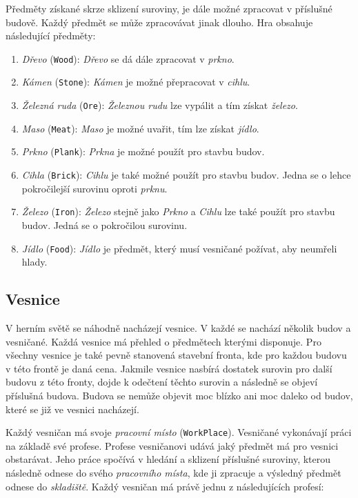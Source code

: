Předměty získané skrze sklizení suroviny, je dále možné zpracovat v příslušné budově. Každý předmět se může zpracovávat jinak dlouho. Hra obsahuje následující předměty:

\begin{enumerate}
    \item \textit{Dřevo} (\verb|Wood|): \textit{Dřevo} se dá dále zpracovat v \textit{prkno}.
    \item \textit{Kámen} (\verb|Stone|): \textit{Kámen} je možné přepracovat v \textit{cihlu}.
    \item \textit{Železná ruda} (\verb|Ore|): \textit{Železnou rudu} lze vypálit a tím získat \textit{železo}.
    \item \textit{Maso} (\verb|Meat|): \textit{Maso} je možné uvařit, tím lze získat \textit{jídlo}.
    \item \textit{Prkno} (\verb|Plank|): \textit{Prkna} je možné použít pro stavbu budov.
    \item \textit{Cihla} (\verb|Brick|): \textit{Cihlu} je také možné použít pro stavbu budov. Jedna se o lehce pokročilejší surovinu oproti \textit{prknu}.
    \item \textit{Železo} (\verb|Iron|): \textit{Železo} stejně jako \textit{Prkno} a \textit{Cihlu} lze také použít pro stavbu budov. Jedná se o pokročilou surovinu.
    \item \textit{Jídlo} (\verb|Food|): \textit{Jídlo} je předmět, který musí vesničané požívat, aby neumřeli hlady.
\end{enumerate}

\subsection{Vesnice}
V herním světě se náhodně nacházejí vesnice. V každé se nachází několik budov a vesničané. Každá vesnice má přehled o předmětech kterými disponuje. Pro všechny vesnice je také pevně stanovená stavební fronta, kde pro každou budovu v této frontě je daná cena. Jakmile vesnice nasbírá dostatek surovin pro další budovu z této fronty, dojde k odečtení těchto surovin a následně se objeví příslušná budova. Budova se nemůže objevit moc blízko ani moc daleko od budov, které se již ve vesnici nacházejí.

Každý vesničan má svoje \textit{pracovní místo} (\verb|WorkPlace|). Vesničané vykonávají práci na základě své profese. Profese vesničanovi udává jaký předmět má pro vesnici obstarávat. Jeho práce spočívá v hledání a sklizení příslušné suroviny, kterou následně odnese do svého \textit{pracovního místa}, kde ji zpracuje a výsledný předmět odnese do \textit{skladiště}. Každý vesničan má právě jednu z následujících profesí:

